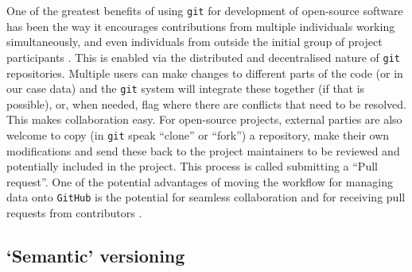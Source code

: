 \documentclass[a4paper,11pt]{article}
\begin{document}
One of the greatest benefits of using \texttt{git} for development of open-source software has been the way it encourages contributions from multiple individuals working simultaneously, and even individuals from outside the initial group of project participants \citep{Rogers-2013}. This is enabled via the distributed and decentralised nature of \texttt{git} repositories. Multiple users can make changes to different parts of the code (or in our case data) and the \texttt{git} system will integrate these together (if that is possible),
 or, when needed, flag where there are conflicts that need to be resolved. This makes collaboration easy. For open-source projects, external parties are also welcome to copy (in \texttt{git} speak ``clone'' or ``fork'') a repository, make their own modifications and send these back to the project maintainers to be reviewed and potentially included in the project. This process is called submitting a ``Pull request''. One of the potential advantages of moving the workflow for managing data onto \texttt{GitHub} is the potential for seamless collaboration and for receiving pull requests from contributors \citep{Perkel-2016}.

\subsection{`Semantic' versioning}
\end{document}
